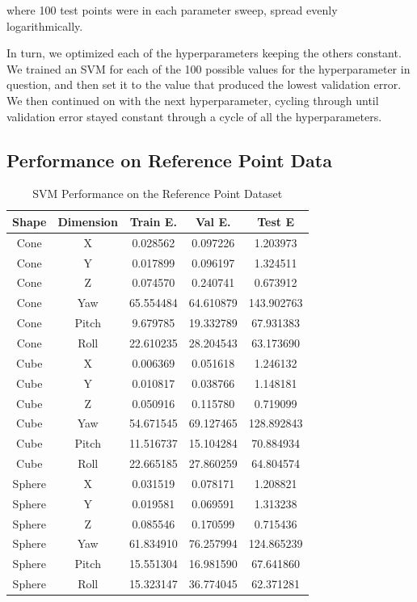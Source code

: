 \documentclass[journal]{IEEEtran}
\begin{document}
\noindent where 100 test points were in each parameter sweep, spread evenly logarithmically.

In turn, we optimized each of the hyperparameters keeping the others constant. We trained an SVM for each of the 100 possible values for the hyperparameter in question, and then set it to the value that produced the lowest validation error. We then continued on with the next hyperparameter, cycling through until validation error stayed constant through a cycle of all the hyperparameters.

\subsection{Performance on Reference Point Data}

\begin{table}[h]
\caption{SVM Performance on the Reference Point Dataset}
\label{SVM_Point}
\centering
	\begin{tabular}{|c|c|c|c|c|}
	\hline
	Shape & Dimension & Train E. & Val E. & Test E\\
   \hline
    Cone &X & 0.028562 & 0.097226 & 1.203973 \\
    Cone &Y & 0.017899 & 0.096197 & 1.324511 \\
    Cone &Z & 0.074570 & 0.240741 & 0.673912 \\
    Cone &Yaw & 65.554484 & 64.610879 & 143.902763 \\
    Cone &Pitch & 9.679785 & 19.332789 & 67.931383 \\
    Cone &Roll & 22.610235 & 28.204543 & 63.173690 \\
    \hline
    Cube & X & 0.006369 & 0.051618 & 1.246132 \\
    Cube & Y & 0.010817 & 0.038766 & 1.148181 \\
    Cube & Z & 0.050916 & 0.115780 & 0.719099 \\
    Cube & Yaw & 54.671545 & 69.127465 & 128.892843 \\
    Cube & Pitch & 11.516737 & 15.104284 & 70.884934 \\
    Cube & Roll & 22.665185 & 27.860259 & 64.804574 \\
    \hline
    Sphere & X & 0.031519 & 0.078171 & 1.208821 \\
    Sphere & Y & 0.019581 & 0.069591 & 1.313238 \\
    Sphere & Z & 0.085546 & 0.170599 & 0.715436\\
    Sphere & Yaw & 61.834910 & 76.257994 & 124.865239 \\
    Sphere & Pitch & 15.551304 & 16.981590 & 67.641860 \\
    Sphere & Roll & 15.323147 & 36.774045 & 62.371281 \\
    \hline
	\end{tabular}
\end{table}
\end{document}
